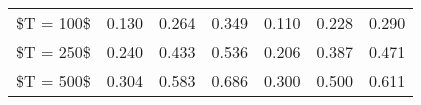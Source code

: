 % 
\begin{tabular}{ccccccc}
  \hline
  \hline
\$T = 100\$ & 0.130 & 0.264 & 0.349 & 0.110 & 0.228 & 0.290 \\ 
  \$T = 250\$ & 0.240 & 0.433 & 0.536 & 0.206 & 0.387 & 0.471 \\ 
  \$T = 500\$ & 0.304 & 0.583 & 0.686 & 0.300 & 0.500 & 0.611 \\ 
   \hline
\end{tabular}
